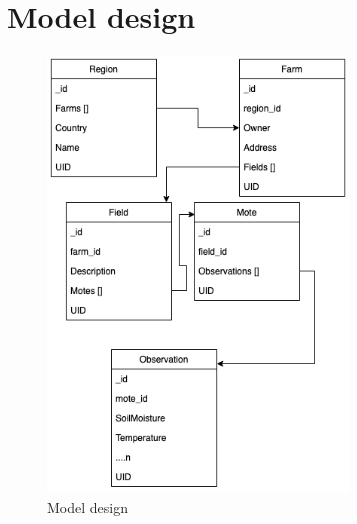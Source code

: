 \documentclass[]{uiophd}
\begin{document}
\section{Model design}
\begin{figure}[h]
\caption{Model design}
\centering
\includegraphics[width=8cm]{model_golden.png}
\end{figure}
\end{document}

